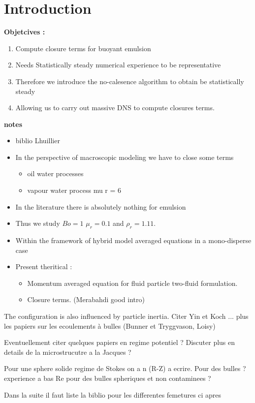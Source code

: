 \section{Introduction}
\textbf{Objetcives : }

\begin{enumerate}
    \item Compute closure terms for buoyant emulsion
    \item Needs Statistically steady numerical experience to be representative 
    \item Therefore we introduce the no-calesence algorithm to obtain be statistically steady
    \item Allowing us to carry out massive DNS to compute closures terms. 
\end{enumerate}
\vspace*{1cm}
\textbf{notes}
\begin{itemize}
    \item biblio Lhuillier
    \item In the perspective of macroscopic modeling we have to close some terms 
    \begin{itemize}
        \item oil water processes
        \item vapour water process mu r = 6 
    \end{itemize}
    \item In the literature there is absolutely nothing for emulsion 
    \item Thus we study $Bo = 1$ $\mu_r = 0.1$ and $\rho_r = 1.11$. 
    \item Within the framework of hybrid model averaged equations in a mono-disperse case 
    \item Present theritical : 
     \begin{itemize}
        \item Momentum averaged equation for fluid particle two-fluid formulation. 
        \item Closure terms. (Merabahdi good intro)
    \end{itemize}
\end{itemize}

The configuration is also influenced by particle inertia. Citer Yin et Koch ... plus les papiers sur les ecoulements à bulles (Bunner et Tryggvason, Loisy)

Eventuellement citer quelques papiers en regime potentiel ? Discuter plus en details de la microstrucutre a la Jacques ?

Pour une sphere solide regime de Stokes on a n (R-Z) a ecrire. Pour des bulles ? experience a bas Re pour des bulles spheriques et non contaminees ?


Dans la suite il faut liste la biblio pour les differentes femetures ci apres







